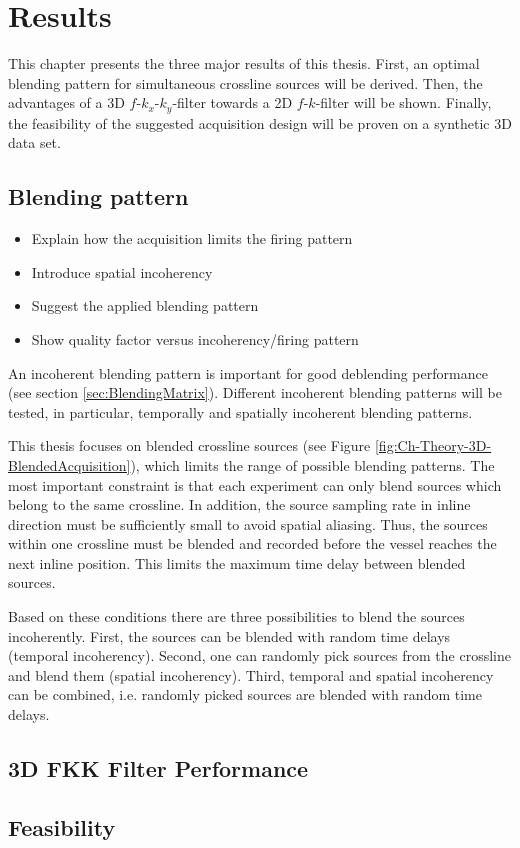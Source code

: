 \chapter{Results}

This chapter presents the three major results of this thesis. First, an optimal blending pattern for simultaneous crossline sources will be derived. Then, the advantages of a 3D $f$-$k_x$-$k_y$-filter towards a 2D $f$-$k$-filter will be shown. Finally, the feasibility of the suggested acquisition design will be proven on a synthetic 3D data set. 

 
\section{Blending pattern}


\begin{itemize}
	\item Explain how the acquisition limits the firing pattern
	\item Introduce spatial incoherency
	\item Suggest the applied blending pattern
	\item Show quality factor versus incoherency/firing pattern
\end{itemize}

An incoherent blending pattern is important for good deblending performance (see section \ref{sec:BlendingMatrix}). Different incoherent blending patterns will be tested, in particular, temporally and spatially incoherent blending patterns. 

This thesis focuses on blended crossline sources (see Figure \ref{fig:Ch-Theory-3D-BlendedAcquisition}), which limits the range of possible blending patterns. The most important constraint is that each experiment can only blend sources which belong to the same crossline. In addition, the source sampling rate in inline direction must be sufficiently small to avoid spatial aliasing. Thus, the sources within one crossline must be blended and recorded before the vessel reaches the next inline position. This limits the maximum time delay between blended sources.

Based on these conditions there are three possibilities to blend the sources incoherently. First, the sources can be blended with random time delays (temporal incoherency). Second, one can randomly pick sources from the crossline and blend them (spatial incoherency). Third, temporal and spatial incoherency can be combined, i.e. randomly picked sources are blended with random time delays.


\section{3D FKK Filter Performance}

\section{Feasibility}








